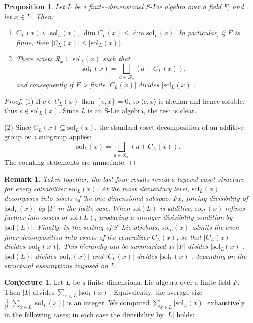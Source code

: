 \documentclass[11pt]{amsart}
\theoremstyle{plain}
\newtheorem{proposition}[theorem]{Proposition}
\newtheorem{remark}[theorem]{Remark}
\def\nil{\mathrm{nil}}
\def\sol{\mathrm{sol}}
\begin{document}
\begin{proposition}\label{Lie-2.13}
Let $L$ be a finite–dimensional S-Lie algebra over a field $F$, and let $x\in L$. Then:
\begin{enumerate}
\item $C_L(x)\subseteq \sol_L(x)$, $\dim C_L(x)\le\dim \sol_L(x)$.  In particular, if $F$ is finite, then $|C_L(x)|\le |\sol_L(x)|$.

\item There exists $\mathcal R_x\subseteq \sol_L(x)$ such that
\[\sol_L(x) = \bigsqcup_{a\in\mathcal R_x} (a+C_L(x)),\]      
and consequently if $F$ is finite $|C_L(x)|$ divides $|\sol_L(x)|$. 
\end{enumerate}
\end{proposition}

\begin{proof}
(1) If $c\in C_L(x)$ then $[c,x]=0$, so $\langle c,x\rangle$ is abelian and hence soluble; thus $c\in \sol_L(x)$. Since $L$ is an S-Lie algebra, the rest is clear. 

(2)  Since $C_L(x)\subseteq \sol_L(x)$, the standard coset decomposition of an additive group by a subgroup applies:
\[\sol_L(x) = \bigsqcup_{a\in\mathcal R_x} (a+C_L(x)).\]   
The counting statements are immediate.
\end{proof}

\begin{remark}
Taken together, the last four results reveal a layered coset structure for every solvabilizer $\sol_L(x)$. At the most elementary level, $\sol_L(x)$ decomposes into cosets of the one-dimensional subspace $Fx$, forcing divisibility of $|\sol_L(x)|$ by $|F|$ in the finite case. When $\sol(L)$ is additive, $\sol_L(x)$ refines further into cosets of $\sol(L)$, 
producing a stronger divisibility condition by $|\sol(L)|$. Finally, in the setting of $S$--Lie algebras, $\sol_L(x)$ admits the even finer decomposition into cosets of the centralizer $C_L(x)$, so that $|C_L(x)|$ divides $|\sol_L(x)|$. 
This hierarchy can be summarized as $|F|$ divides $|\sol_L(x)|$, $|\sol(L)|$ divides $|\sol_L(x)|$ and $|C_L(x)|$ divides $|\sol_L(x)|$, depending on the structural assumptions imposed on $L$. 
\end{remark}



\textbf{Conjecture 1.}\label{strong-div}
Let $L$ be a finite–dimensional Lie algebra over a finite field $F$. Then  $|L|$ divides $\sum_{x\in L} |\sol_L(x)|$. Equivalently, the average size $\frac{1}{|L|}\sum_{x\in L} |\sol_L(x)|$ is an integer. We computed $\sum_{x\in L}|\sol_L(x)|$ exhaustively in the following cases; in each case the divisibility by $|L|$ holds:
\end{document}
